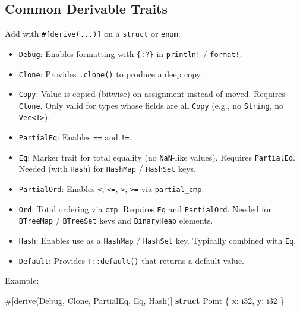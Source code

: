 \documentclass[
  11pt,
]{article}
\newenvironment{Shaded}{}{}
\newcommand{\AttributeTok}[1]{\textcolor[rgb]{0.49,0.56,0.16}{#1}}
\newcommand{\BuiltInTok}[1]{\textcolor[rgb]{0.00,0.50,0.00}{#1}}
\newcommand{\DataTypeTok}[1]{\textcolor[rgb]{0.56,0.13,0.00}{#1}}
\newcommand{\KeywordTok}[1]{\textcolor[rgb]{0.00,0.44,0.13}{\textbf{#1}}}
\newcommand{\NormalTok}[1]{#1}
\newcommand{\OperatorTok}[1]{\textcolor[rgb]{0.40,0.40,0.40}{#1}}
\providecommand{\tightlist}{%
  \setlength{\itemsep}{0pt}\setlength{\parskip}{0pt}}
\begin{document}
\subsection{Common Derivable Traits}\label{common-derivable-traits}

Add with \texttt{\#{[}derive(...){]}} on a \texttt{struct} or
\texttt{enum}:

\begin{itemize}
\tightlist
\item
  \texttt{Debug}: Enables formatting with \texttt{\{:?\}} in
  \texttt{println!} / \texttt{format!}.
\item
  \texttt{Clone}: Provides \texttt{.clone()} to produce a deep copy.
\item
  \texttt{Copy}: Value is copied (bitwise) on assignment instead of
  moved. Requires \texttt{Clone}. Only valid for types whose fields are
  all \texttt{Copy} (e.g., no \texttt{String}, no
  \texttt{Vec\textless{}T\textgreater{}}).
\item
  \texttt{PartialEq}: Enables \texttt{==} and \texttt{!=}.
\item
  \texttt{Eq}: Marker trait for total equality (no \texttt{NaN}-like
  values). Requires \texttt{PartialEq}. Needed (with \texttt{Hash}) for
  \texttt{HashMap} / \texttt{HashSet} keys.
\item
  \texttt{PartialOrd}: Enables \texttt{\textless{}},
  \texttt{\textless{}=}, \texttt{\textgreater{}},
  \texttt{\textgreater{}=} via \texttt{partial\_cmp}.
\item
  \texttt{Ord}: Total ordering via \texttt{cmp}. Requires \texttt{Eq}
  and \texttt{PartialOrd}. Needed for \texttt{BTreeMap} /
  \texttt{BTreeSet} keys and \texttt{BinaryHeap} elements.
\item
  \texttt{Hash}: Enables use as a \texttt{HashMap} / \texttt{HashSet}
  key. Typically combined with \texttt{Eq}.
\item
  \texttt{Default}: Provides \texttt{T::default()} that returns a
  default value.
\end{itemize}

Example:

\begin{Shaded}
\begin{Highlighting}[]
\AttributeTok{\#[}\NormalTok{derive}\AttributeTok{(}\BuiltInTok{Debug}\OperatorTok{,} \BuiltInTok{Clone}\OperatorTok{,} \BuiltInTok{PartialEq}\OperatorTok{,} \BuiltInTok{Eq}\OperatorTok{,} \BuiltInTok{Hash}\AttributeTok{)]}
\KeywordTok{struct}\NormalTok{ Point }\OperatorTok{\{}\NormalTok{ x}\OperatorTok{:} \DataTypeTok{i32}\OperatorTok{,}\NormalTok{ y}\OperatorTok{:} \DataTypeTok{i32} \OperatorTok{\}}
\end{Highlighting}
\end{Shaded}
\end{document}
